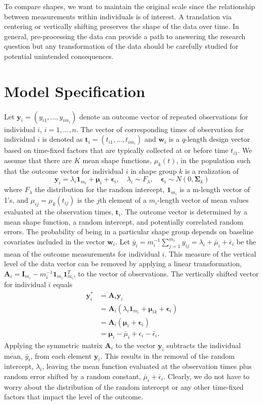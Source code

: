 \documentclass[12pt]{article}
\newcommand{\B}[0]{\mathbf}
\newcommand{\BS}[0]{\boldsymbol}
\begin{document}
To compare shapes, we want to maintain the original scale since the relationship between measurements within individuals is of interest. A translation via centering \cite{chiou2008} or vertically shifting preserves the shape of the data over time. In general, pre-processing the data can provide a path to answering the research question but any transformation of the data should be carefully studied for potential unintended consequences.

\section{Model Specification}
 Let $\B y_{i}=(y_{i1},...,y_{im_{i}})$ denote an outcome vector of repeated observations for individual $i$, $i=1,...,n$. The vector of corresponding times of observation for individual $i$ is denoted as $\B t_{i}=(t_{i1},...,t_{im_{i}})$ and $\B w_{i}$ is a $q$-length design vector based on time-fixed factors that are typically collected at or before time $t_{i1}$. We assume that there are $K$ mean shape functions, $\mu_{k}(t)$, in the population such that the outcome vector for individual $i$ in shape group $k$ is a realization of
 $$\B y_{i} = \lambda_{i}\B 1_{m_{i}}+\BS\mu_{i}+\BS\epsilon_{i},\quad \lambda_{i}\sim F_{\lambda}, \quad \BS\epsilon_{i}\sim N(0,\BS\Sigma_{k})$$
 where $F_{\lambda}$ the distribution for the random intercept, $\B 1_{m_{i}}$ is a m-length vector of 1's, and $\mu_{ij} = \mu_{k}(t_{ij})$ is the $j$th element of a $m_{i}$-length vector of mean values evaluated at the observation times, $\B t_{i}$. The outcome vector is determined by a mean shape function, a random intercept, and potentially correlated random errors. The probability of being in a particular shape group depends on baseline covariates included in the vector $\B w_{i}$. Let $\bar{y}_{i}= m_{i}^{-1}\sum^{m_{i}}_{j=1} y_{ij} = \lambda_{i}+\bar{\mu}_{i}+\bar{\epsilon}_{i}$ be the mean of the outcome measurements for individual $i$. This measure of the vertical level of the data vector can be removed by applying a linear transformation, $\B A_{i} = \B I_{m_{i}} - m_{i}^{-1}\B 1_{m_{i}}\B 1_{m_{i}}^{T}$, to the vector of observations. The vertically shifted vector for individual $i$ equals 
\begin{align*}
\B y^{*}_{i} &= \B A_{i}\B y_{i}\\
&=\B A_{i}(\lambda_{i}\B 1_{m_{i}}+\BS\mu_{ik}+\BS\epsilon_{i})\\
&=\B A_{i}(\BS\mu_{i}+\BS\epsilon_{i})\\
&=\BS\mu_{i} - \bar{\mu}_{i}+\epsilon_{i}-\bar{\epsilon}_{i}.
\end{align*}
Applying the symmetric matrix $\B A_{i}$ to the vector $\B y_{i}$ subtracts the individual mean, $\bar{y}_{i}$, from each element $\B y_{i}$. This results in the removal of the random intercept, $\lambda_{i}$, leaving the mean function evaluated at the observation times plus random error shifted by a random constant, $\bar{\mu}_{i}+\bar{\epsilon}_{i}$. Clearly, we do not have to worry about the distribution of the random intercept or any other time-fixed factors that impact the level of the outcome. 
\end{document}
